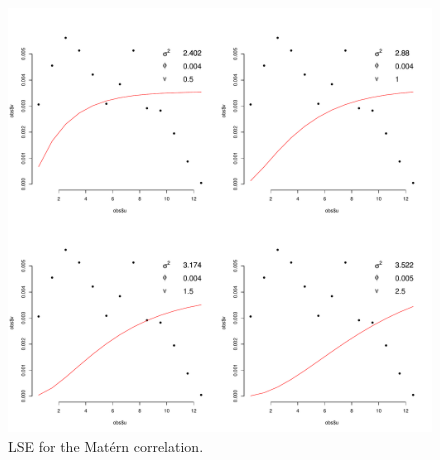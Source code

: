 \documentclass[12pt]{article}
\begin{document}
\begin{figure}[ht]
\begin{center}
\includegraphics[scale=0.5]{figs/matern.pdf}
\end{center}
\caption{LSE for the Mat{\'e}rn correlation.}
\end{figure}
\end{document}
